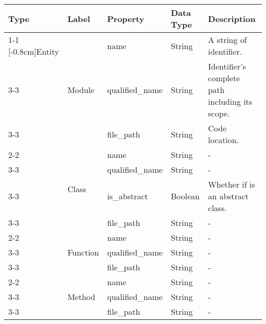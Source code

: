 \begin{tabular}{p{1.6cm}p{1.7cm}p{2cm}p{3.3cm}p{7.5cm}}
\toprule
\textbf{Type} & \textbf{Label} & \textbf{Property} & \textbf{Data Type} & \textbf{Description} \\
\cmidrule{1-1}\cmidrule{2-2}\cmidrule{3-3}\cmidrule{4-4}\cmidrule{5-5}
\multirow{13}{*}[-0.8cm]{Entity} & \multirow{3}{*}{Module} & name & String & A string of identifier. \\
\cmidrule{3-3}\cmidrule{4-4}\cmidrule{5-5}
 &  & qualified\_name & String & Identifier's complete path including its scope. \\
\cmidrule{3-3}\cmidrule{4-4}\cmidrule{5-5}
 &  & file\_path & String & Code location. \\
\cmidrule{2-2}\cmidrule{3-3}\cmidrule{4-4}\cmidrule{5-5}
 & \multirow{4}{*}{Class} & name & String & - \\
\cmidrule{3-3}\cmidrule{4-4}\cmidrule{5-5}
 &  & qualified\_name & String & - \\
\cmidrule{3-3}\cmidrule{4-4}\cmidrule{5-5}
 &  & is\_abstract & Boolean & Whether if is an abstract class. \\
\cmidrule{3-3}\cmidrule{4-4}\cmidrule{5-5}
 &  & file\_path & String & - \\
\cmidrule{2-2}\cmidrule{3-3}\cmidrule{4-4}\cmidrule{5-5}
 & \multirow{3}{*}{Function} & name & String & - \\
\cmidrule{3-3}\cmidrule{4-4}\cmidrule{5-5}
 &  & qualified\_name & String & - \\
\cmidrule{3-3}\cmidrule{4-4}\cmidrule{5-5}
 &  & file\_path & String & - \\
\cmidrule{2-2}\cmidrule{3-3}\cmidrule{4-4}\cmidrule{5-5}
 & \multirow{3}{*}{Method} & name & String & - \\
\cmidrule{3-3}\cmidrule{4-4}\cmidrule{5-5}
 &  & qualified\_name & String & - \\
\cmidrule{3-3}\cmidrule{4-4}\cmidrule{5-5}
 &  & file\_path & String & - \\
\bottomrule
\end{tabular}


